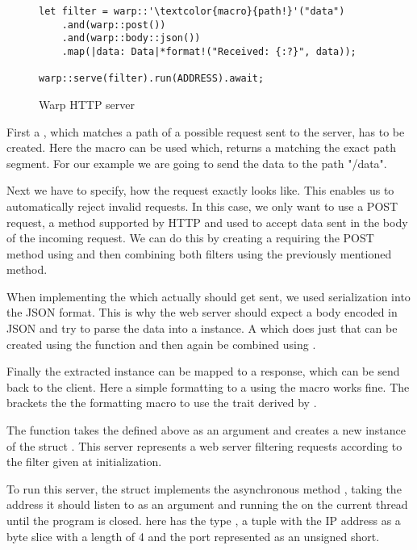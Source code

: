 \begin{figure}[ht]
    \begin{verbatim}
let filter = warp::'\textcolor{macro}{path!}'("data")
    .and(warp::post())
    .and(warp::body::json())
    .map(|data: Data|*format!("Received: {:?}", data));

warp::serve(filter).run(ADDRESS).await;
    \end{verbatim}
    \caption{Warp HTTP server}
\end{figure}

First a , which matches a path of a possible request sent to the server, has to be created. Here the macro
 can be used which, returns a  matching the exact path segment. For our example
we are going to send the data to the path "/data".

Next we have to specify, how the request exactly looks like. This enables us to automatically reject invalid requests.
In this case, we only want to use a POST request, a method supported by HTTP and used to accept data sent in the body
of the incoming request. We can do this by creating a  requiring the POST method using 
and then combining both filters using the previously mentioned  method.

When implementing the  which actually should get sent, we used serialization into the JSON format. This is
why the web server should expect a body encoded in JSON and try to parse the data into a  instance. A
 which does just that can be created using the function  and then again be
combined using .

Finally the extracted  instance can be mapped to a response, which can be send back to the client. Here a
simple formatting to a  using the  macro works fine. The  brackets the the
formatting macro to use the  trait derived by .

The function  takes the  defined above as an argument and creates a new instance of the
struct . This server represents a web server filtering requests according to the filter given at
initialization.

To run this server, the struct implements the asynchronous method , taking the address it should listen to
as an argument and running the  on the current thread until the program is closed.  here has
the type , a tuple with the IP address as a byte slice with a length of 4 and the port represented
as an unsigned short.


